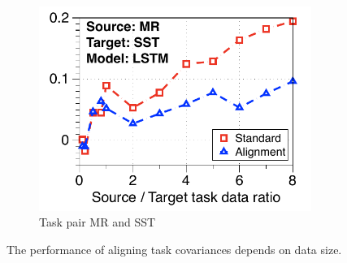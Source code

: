 \begin{figure}[!ht]
\begin{subfigure}[b]{0.33\textwidth}
		\includegraphics[width=0.975\textwidth]{figures/ratio_alignment_mr_sst_lstm.pdf}
		\caption{Task pair MR and SST}
	\end{subfigure}
	\caption{The performance of aligning task covariances depends on data size.}
	\label{fig_covariate}
\end{figure}

